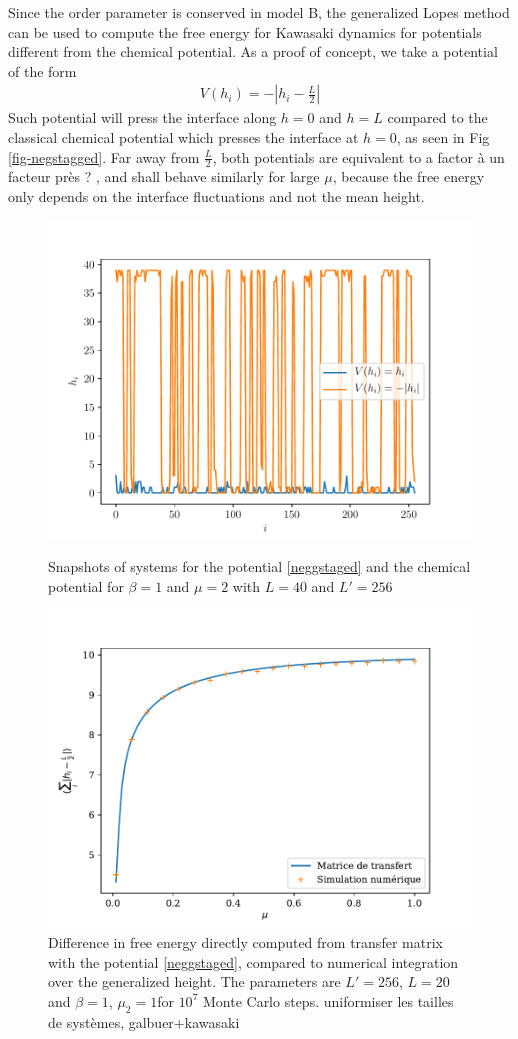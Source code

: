 {Since the order parameter is conserved in model B, the generalized Lopes method can be used to compute the free energy for Kawasaki dynamics for potentials different from the chemical potential. 
As a proof of concept, we take a potential of the form
\begin{align}
    V(h_i) = - |h_i-\frac{L}{2}|
    \label{neggstaged}
\end{align}
Such potential will press the interface along $h=0$ and $h=L$ compared to the classical chemical potential which presses the interface at $h=0$, as seen in Fig \ref{fig-negstagged}. Far away from $\frac{L}{2}$, both potentials are equivalent to a factor {\color{red} à un facteur près ? } , and shall behave similarly for large $\mu$, because the free energy only depends on the interface fluctuations and not the mean height. 


\begin{figure}
    \centering
	\includegraphics[width=0.7\linewidth]{int-dyn/comp-potentiels-chimiques.pdf}
	\caption{Snapshots of systems for the potential \eqref{neggstaged} and the chemical potential for $\beta=1$ and $\mu=2$ with $L=40$ and $L'=256$}
    \label{fig-negstagged}	
    \centering
   	\includegraphics[width=0.7\linewidth]{int-dyn/simu-tm-negstagged-l20.pdf}
    \caption{Difference in free energy directly computed from transfer matrix with the potential \eqref{neggstaged}, compared to numerical integration over the generalized height. The parameters are $L' = 256$, $L=20$ and $\beta=1$, $\mu_2 = 1$for $10^7$ Monte Carlo steps. {\color{red} uniformiser les tailles de systèmes, galbuer+kawasaki}} 
   	\label{fig-int-negstagged}    
\end{figure}  

}
